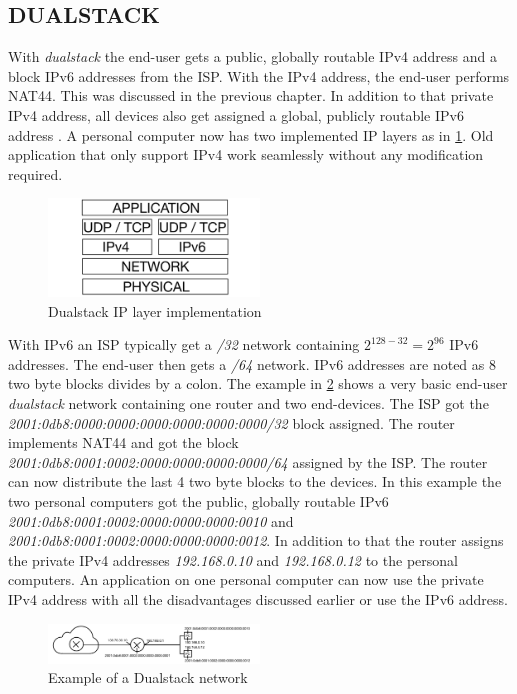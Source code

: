 \documentclass[format=sigconf, natbib=true, nonacm=true]{acmart}
\begin{document}
    \subsection{DUALSTACK}
    With \textit{dualstack} the end-user gets a public, globally routable IPv4 address and a block IPv6 addresses from the ISP. With the IPv4 address, the end-user performs NAT44. This was discussed in the previous chapter. In addition to that private IPv4 address, all devices also get assigned a global, publicly routable IPv6 address \cite{8716482}. A personal computer now has two implemented IP layers as in \ref{fig:dualstack}. Old application that only support IPv4 work seamlessly without any modification required.
    \begin{figure}
        \centering
        \includegraphics[width=0.5\textwidth]{images/dualstack.png}
        \caption{Dualstack IP layer implementation}
        \label{fig:dualstack}
    \end{figure}
    With IPv6 an ISP typically get a \textit{/32} network containing $2^{128-32}=2^{96}$ IPv6 addresses. The end-user then gets a \textit{/64} network. IPv6 addresses are noted as 8 two byte blocks divides by a colon. The example in \ref{fig:dualstack_network} shows a very basic end-user \textit{dualstack} network containing one router and two end-devices. The ISP got the \textit{2001:0db8:0000:0000:0000:0000:0000:0000/32} block assigned. The router implements NAT44 and got the block \textit{2001:0db8:0001:0002:0000:0000:0000:0000/64} assigned by the ISP. The router can now distribute the last 4 two byte blocks to the devices. In this example the two personal computers got the public, globally routable IPv6 \textit{2001:0db8:0001:0002:0000:0000:0000:0010} and \textit{2001:0db8:0001:0002:0000:0000:0000:0012}. In addition to that the router assigns the private IPv4 addresses \textit{192.168.0.10} and \textit{192.168.0.12} to the personal computers. An application on one personal computer can now use the private IPv4 address with all the disadvantages discussed earlier or use the IPv6 address.
    \begin{figure}
        \centering
        \includegraphics[width=0.5\textwidth]{images/dualstack_network.png}
        \caption{Example of a Dualstack network}
        \label{fig:dualstack_network}
    \end{figure}
\end{document}

